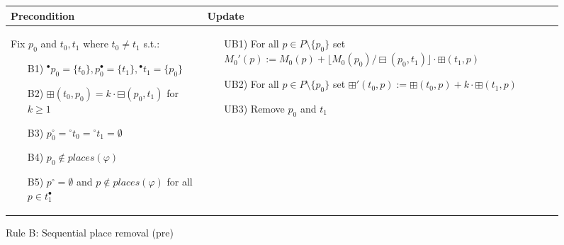 \begin{figure}[h]
    \begin{adjustbox}{center}
        \begin{tabular}{|p{70mm}|p{62mm}|} \hline
        Precondition & Update \\ \hline
        Fix $p_0$ and $t_0,t_1$ where $t_0\neq t_1$ s.t.:
        \begin{itemize}[leftmargin=10mm]
            \item[B1)] ${}^\bullet p_0=\{t_0\}, p_0^\bullet=\{t_1\},{}^\bullet t_1=\{p_0\}$
            \item[B2)] $\boxplus(t_0,p_0)=k\cdot\boxminus(p_0, t_1)$ for $k\geq 1$
            \item[B3)] $p_0^\circ ={}^\circ t_0={}^\circ t_1=\emptyset$
            \item[B4)] $p_0\notin places(\varphi)$
            \item[B5)] $p^\circ =\emptyset$ and $p\notin places(\varphi)$ for all $p\in t_1^\bullet$
        \end{itemize} &
        \begin{itemize}[leftmargin=10mm]
            \item[UB1)] For all $p\in P\setminus\{p_0\}$ set $M_0'(p):=M_0(p)+\lfloor M_0(p_0)/\boxminus(p_0,t_1)\rfloor\cdot\boxplus(t_1,p)$
            \item[UB2)] For all $p\in P\setminus\{p_0\}$ set $\boxplus'(t_0,p):=\boxplus(t_0,p)+k\cdot\boxplus(t_1,p)$
            \item[UB3)] Remove $p_0$ and $t_1$
        \end{itemize} \\ \hline
        \end{tabular}
    \end{adjustbox}
    \caption{Rule B: Sequential place removal (pre)}
    \label{fig:rule_b_pre}
\end{figure}

